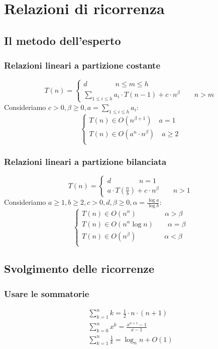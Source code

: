 \chapter{Relazioni di ricorrenza}

\section{Il metodo dell’esperto}
\subsection{Relazioni lineari a partizione costante}
\begin{equation}
	T(n) = 
	\begin{cases}
		d \qquad \qquad n \leq m \leq h\\
		\sum_{1 \leq i \leq h} a_i \cdot T(n-1) + c\cdot n^{\beta} \qquad n >m
	\end{cases}
\end{equation}
Consideriamo $c > 0, \beta \geq 0, a = \sum_{1 \leq i \leq h} a_i$:
\begin{equation}
	\begin{cases}
		T(n) \in O (n^{\beta + 1}) \quad a = 1\\
		T(n) \in O (a^n \cdot n^{\beta}) \quad a \geq 2\\
	\end{cases}
\end{equation}	


\subsection{Relazioni lineari a partizione bilanciata}
\begin{equation}
	T(n) = 
	\begin{cases}
		d \qquad \qquad n = 1\\
		a \cdot T(\frac{n}{b}) + c \cdot n^{\beta} \qquad n > 1
	\end{cases}
\end{equation}
Consideriamo $a \geq 1, b \geq 2, c > 0, d, \beta \geq 0, \alpha = \frac{\log{a}}{\log{b}}$:
\begin{equation}
	\begin{cases}
		T(n) \in O (n^{\alpha}) \qquad \qquad \alpha > \beta\\
		T(n) \in O (n^{\alpha} \log{n}) \qquad  \alpha = \beta\\
		T(n) \in O (n^{\beta}) \qquad \qquad \alpha < \beta\\
	\end{cases}
\end{equation}	

\section{Svolgimento delle ricorrenze}
\subsection{Usare le sommatorie}
\begin{equation}\begin{aligned}
	\sum_{k = 1}^{n} k = \frac{1}{2} \cdot n \cdot (n+1)\\
	\sum_{k = 0}^{n} x^k = \frac{x^{n+1} - 1}{x - 1}\\
	\sum_{k = 1}^{n} \frac{1}{k} = \log_n{n} + O(1)
\end{aligned}\end{equation}


